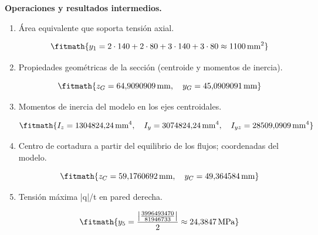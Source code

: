 \noindent\textbf{Operaciones y resultados intermedios.}

\begin{enumerate}

\item Área equivalente que soporta tensión axial.

\[\fitmath{y_{1}=2\cdot 140+2\cdot 80+3\cdot 140+3\cdot 80\approx 1100\,\mathrm{mm^{2}}}\]

\item Propiedades geométricas de la sección (centroide y momentos de inercia).

\[\fitmath{z_G=64{,}9090909\,\mathrm{mm},\quad y_G=45{,}0909091\,\mathrm{mm}}\]

\item Momentos de inercia del modelo en los ejes centroidales.

\[\fitmath{I_z=1304824{,}24\,\mathrm{mm}^{4},\quad I_y=3074824{,}24\,\mathrm{mm}^{4},\quad I_{yz}=28509{,}0909\,\mathrm{mm}^{4}}\]

\item Centro de cortadura a partir del equilibrio de los flujos; coordenadas del modelo.

\[\fitmath{z_C=59{,}1760692\,\mathrm{mm},\quad y_C=49{,}364584\,\mathrm{mm}}\]

\item Tensión máxima |q|/t en pared derecha.

\[\fitmath{y_{5}=\frac{\left|\frac{3996493470}{81946733}\right|}{2}\approx 24{,}3847\,\mathrm{MPa}}\]

\end{enumerate}
